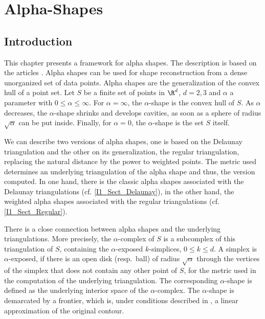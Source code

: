 
\chapter{Alpha-Shapes} \label{I1_ChapterAlphashapes}

\ccChapterSubTitle{\alphashapeRevision, \alphashapeDate}

\section{Introduction}

This chapter presents a framework for alpha shapes. The description is based on
the articles \cite{em-tdas-94,e-was-92}.  Alpha shapes can be used for shape 
reconstruction from a dense unorganized set of data points.  Alpha shapes are
the generalization of the convex hull of a point set. Let $S$ be a finite set of
points in $\R^d$, $d = 2,3$ and $\alpha$ a parameter with $0 \leq \alpha \leq
\infty$. For $\alpha = \infty$, the $\alpha$-shape is the convex hull of $S$. As 
$\alpha$ decreases, the $\alpha$-shape shrinks and develops cavities, as soon as 
a sphere of radius $\sqrt{\alpha}$ can be put inside.
Finally, for $\alpha = 0$, the $\alpha$-shape is the set $S$ itself.

We can describe two versions of alpha shapes, one is based on the Delaunay
triangulation and the other on its generalization, the regular triangulation,
replacing the natural distance by the power to weighted points. The metric used
determines an underlying triangulation of the alpha shape and thus, the version
computed. 
In one hand, there is the classic alpha shapes associated with the Delaunay triangulations
(cf. \ref{I1_Sect_Delaunay}), in the other hand, the weighted alpha shapes
associated with the regular triangulations (cf. \ref{I1_Sect_Regular}).

There is a close connection between alpha shapes and the underlying
triangulations. More precisely, the $\alpha$-complex of $S$ is a
subcomplex of this triangulation of $S$, containing the $\alpha$-exposed
$k$-simplices, $0 \leq k \leq d$. A simplex is $\alpha$-exposed, if there is an
open disk (resp.\ ball) of radius $\sqrt{\alpha}$ through the vertices of the
simplex that does not contain any other point of $S$, for the metric used in
the computation of the underlying triangulation.  The corresponding
$\alpha$-shape is defined as the underlying interior space of the
$\alpha$-complex. The  $\alpha$-shape is demarcated by a frontier, which is,
under conditions described in \cite{bb-srmua-97t}, a linear approximation of the
original contour. 

